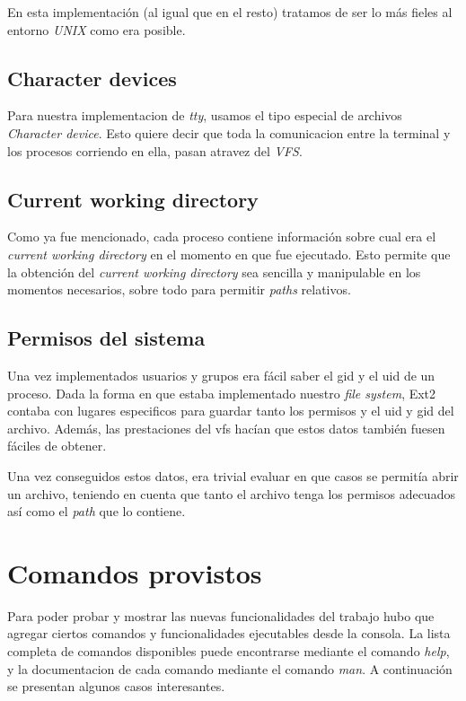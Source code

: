 \documentclass[a4paper,10pt]{article}
\begin{document}
En esta implementación (al igual que en el resto) tratamos de ser lo más fieles al entorno \textit{UNIX} como 
era posible.

\subsection{Character devices}
Para nuestra implementacion de \textit{tty}, usamos el tipo especial de archivos \textit{Character device}.
Esto quiere decir que toda la comunicacion entre la terminal y los procesos corriendo en ella, pasan atravez del \textit{VFS}.

\subsection{Current working directory}
    
Como ya fue mencionado, cada proceso contiene información sobre cual era el \textit{current working directory} en
el momento en que fue ejecutado. Esto permite que la obtención del \textit{current working directory} sea sencilla
y manipulable en los momentos necesarios, sobre todo para permitir \textit{paths} relativos.

    
\subsection{Permisos del sistema}
Una vez implementados usuarios y grupos era fácil saber el gid y el uid de un proceso. Dada la forma en que estaba
implementado nuestro \textit{file system}, Ext2 contaba con lugares especificos para guardar tanto los permisos y el
uid y gid del archivo. Además, las prestaciones del vfs hacían que estos datos también fuesen fáciles de obtener.

Una vez conseguidos estos datos, era trivial evaluar en que casos se permitía abrir un archivo, teniendo en cuenta
que tanto el archivo tenga los permisos adecuados así como el \textit{path} que lo contiene.

\newpage
\section{Comandos provistos}
Para poder probar y mostrar las nuevas funcionalidades del trabajo hubo que agregar ciertos comandos y funcionalidades ejecutables desde la consola. 
La lista completa de comandos disponibles puede encontrarse mediante el comando \textit{help}, y la documentacion de cada comando mediante el comando \textit{man}.
A continuación se presentan algunos casos interesantes.
\end{document}
